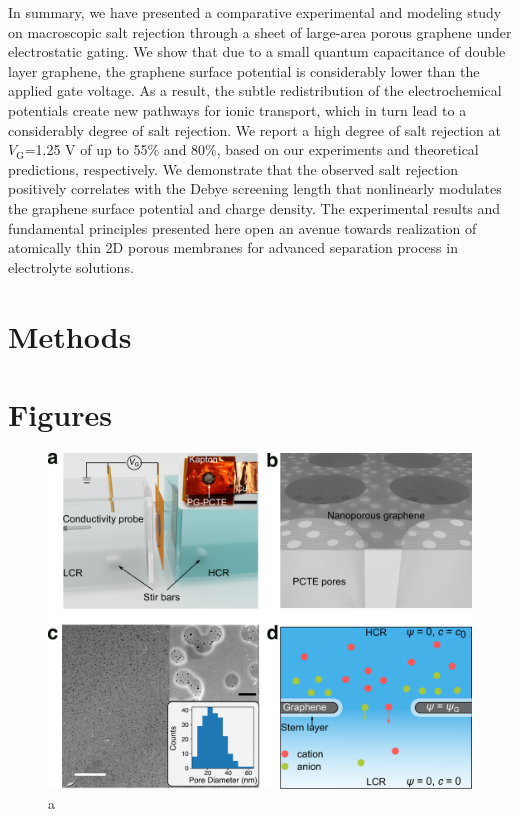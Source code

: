 \documentclass[manuscript=letter, email=true, hyperref=true, keywords=false]{achemso}
\begin{document}
In summary, we have
presented a comparative experimental and modeling study on macroscopic
salt rejection through a sheet of large-area porous graphene under
electrostatic gating. We show that due to a small quantum capacitance
of double layer graphene, the graphene surface potential is
considerably lower than the applied gate voltage. As a result, the
subtle redistribution of the electrochemical potentials create new
pathways for ionic transport, which in turn lead to a considerably
degree of salt rejection. We report a high degree of salt rejection at
$V_{\mathrm{G}}$=1.25 V of up to 55\% and 80\%, based on our
experiments and theoretical predictions, respectively. We demonstrate
that the observed salt rejection positively correlates with the Debye
screening length that nonlinearly modulates the graphene surface
potential and charge density. The experimental results and fundamental
principles presented here open an avenue towards realization of
atomically thin 2D porous membranes for advanced separation process in
electrolyte solutions.

\section{Methods}
\label{sec:methods}









\section*{}
\label{sec:ref}


\clearpage
\section{Figures}
\label{sec:figs}

\begin{figure}[htbp]
  \centering
  \includegraphics[width=0.85\linewidth]{img/fig1.pdf}
  \caption{a}
  \label{fig:1}
\end{figure}
\end{document}
